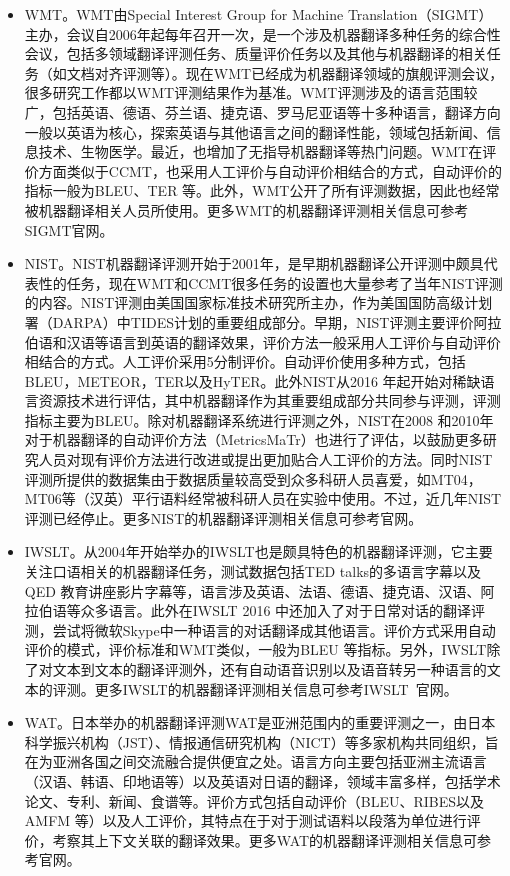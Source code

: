 \begin{appendices}
\begin{itemize}
\vspace{0.5em}
\item WMT。WMT由Special Interest Group for Machine Translation（SIGMT）主办，会议自2006年起每年召开一次，是一个涉及机器翻译多种任务的综合性会议，包括多领域翻译评测任务、质量评价任务以及其他与机器翻译的相关任务（如文档对齐评测等）。现在WMT已经成为机器翻译领域的旗舰评测会议，很多研究工作都以WMT评测结果作为基准。WMT评测涉及的语言范围较广，包括英语、德语、芬兰语、捷克语、罗马尼亚语等十多种语言，翻译方向一般以英语为核心，探索英语与其他语言之间的翻译性能，领域包括新闻、信息技术、生物医学。最近，也增加了无指导机器翻译等热门问题。WMT在评价方面类似于CCMT，也采用人工评价与自动评价相结合的方式，自动评价的指标一般为BLEU、TER 等。此外，WMT公开了所有评测数据，因此也经常被机器翻译相关人员所使用。更多WMT的机器翻译评测相关信息可参考SIGMT官网。

\vspace{0.5em}
\item NIST。NIST机器翻译评测开始于2001年，是早期机器翻译公开评测中颇具代表性的任务，现在WMT和CCMT很多任务的设置也大量参考了当年NIST评测的内容。NIST评测由美国国家标准技术研究所主办，作为美国国防高级计划署（DARPA）中TIDES计划的重要组成部分。早期，NIST评测主要评价阿拉伯语和汉语等语言到英语的翻译效果，评价方法一般采用人工评价与自动评价相结合的方式。人工评价采用5分制评价。自动评价使用多种方式，包括BLEU，METEOR，TER以及HyTER。此外NIST从2016 年起开始对稀缺语言资源技术进行评估，其中机器翻译作为其重要组成部分共同参与评测，评测指标主要为BLEU。除对机器翻译系统进行评测之外，NIST在2008 和2010年对于机器翻译的自动评价方法（MetricsMaTr）也进行了评估，以鼓励更多研究人员对现有评价方法进行改进或提出更加贴合人工评价的方法。同时NIST评测所提供的数据集由于数据质量较高受到众多科研人员喜爱，如MT04，MT06等（汉英）平行语料经常被科研人员在实验中使用。不过，近几年NIST评测已经停止。更多NIST的机器翻译评测相关信息可参考官网。

\vspace{0.5em}
\item IWSLT。从2004年开始举办的IWSLT也是颇具特色的机器翻译评测，它主要关注口语相关的机器翻译任务，测试数据包括TED talks的多语言字幕以及QED 教育讲座影片字幕等，语言涉及英语、法语、德语、捷克语、汉语、阿拉伯语等众多语言。此外在IWSLT 2016 中还加入了对于日常对话的翻译评测，尝试将微软Skype中一种语言的对话翻译成其他语言。评价方式采用自动评价的模式，评价标准和WMT类似，一般为BLEU 等指标。另外，IWSLT除了对文本到文本的翻译评测外，还有自动语音识别以及语音转另一种语言的文本的评测。更多IWSLT的机器翻译评测相关信息可参考IWSLT\ 官网。

\vspace{0.5em}
\item WAT。日本举办的机器翻译评测WAT是亚洲范围内的重要评测之一，由日本科学振兴机构（JST）、情报通信研究机构（NICT）等多家机构共同组织，旨在为亚洲各国之间交流融合提供便宜之处。语言方向主要包括亚洲主流语言（汉语、韩语、印地语等）以及英语对日语的翻译，领域丰富多样，包括学术论文、专利、新闻、食谱等。评价方式包括自动评价（BLEU、RIBES以及AMFM 等）以及人工评价，其特点在于对于测试语料以段落为单位进行评价，考察其上下文关联的翻译效果。更多WAT的机器翻译评测相关信息可参考官网。


\end{itemize}
\end{appendices}

